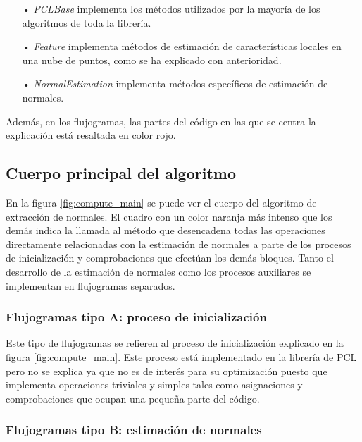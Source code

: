 \begin{itemize}
\item[•]\textit{PCLBase}\cite{pclbase} implementa los métodos utilizados por la mayoría de los algoritmos de toda la librería.
\item[•]\textit{Feature}\cite{feature} implementa métodos de estimación de características locales en una nube de puntos, como se ha explicado con anterioridad.
\item[•]\textit{NormalEstimation}\cite{normal_estimation} implementa métodos específicos de estimación de normales.
\end{itemize} 

Además, en los flujogramas, las partes del código en las que se centra la explicación está resaltada en color rojo.


\subsection{Cuerpo principal del algoritmo}
En la figura \ref{fig:compute_main} se puede ver el cuerpo del algoritmo de extracción de normales. El cuadro con un color naranja más intenso que los demás indica la llamada al método que desencadena todas las operaciones directamente relacionadas con la estimación de normales a parte de los procesos de inicialización y comprobaciones que efectúan los demás bloques. Tanto el desarrollo de la estimación de normales como los procesos auxiliares se implementan en flujogramas separados.

\subsubsection{Flujogramas tipo A: proceso de inicialización}
Este tipo de flujogramas se refieren al proceso de inicialización explicado en la figura \ref{fig:compute_main}. Este proceso está implementado en la librería de PCL pero no se explica ya que no es de interés para su optimización puesto que implementa operaciones triviales y simples tales como asignaciones y comprobaciones que ocupan una pequeña parte del código.




\subsubsection{Flujogramas tipo B: estimación de normales}

